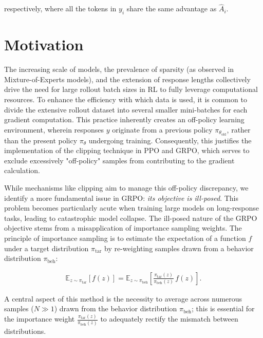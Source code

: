 respectively, where all the tokens in $y_i$ share the same advantage as $\widehat{A}_{i}$.

\section{Motivation}
\label{sec:motivation}

The increasing scale of models, the prevalence of sparsity (as observed in Mixture-of-Experts models), and the extension of response lengths collectively drive the need for large rollout batch sizes in RL to fully leverage computational resources. To enhance the efficiency with which data is used, it is common to divide the extensive rollout dataset into several smaller mini-batches for each gradient computation. This practice inherently creates an off-policy learning environment, wherein responses $y$ originate from a previous policy $\pi_{\theta_\text{old}}$, rather than the present policy $\pi_\theta$ undergoing training. Consequently, this justifies the implementation of the clipping technique in PPO and GRPO, which serves to exclude excessively "off-policy" samples from contributing to the gradient calculation.

While mechanisms like clipping aim to manage this off-policy discrepancy, we identify a more fundamental issue in GRPO: \textit{its objective is ill-posed}. This problem becomes particularly acute when training large models on long-response tasks, leading to catastrophic model collapse. The ill-posed nature of the GRPO objective stems from a misapplication of importance sampling weights. The principle of importance sampling is to estimate the expectation of a function $f$ under a target distribution $\pi_\text{tar}$ by re-weighting samples drawn from a behavior distribution $\pi_\text{beh}$:

\begin{align}
\mathbb{E}_{z \sim \pi_\text{tar}} \left[ f(z) \right] = \mathbb{E}_{z \sim \pi_\text{beh}} \left[ \frac{ \pi_\text{tar} (z) }{ \pi_\text{beh} (z)} \, f(z) \right].
\end{align}

A central aspect of this method is the necessity to average across numerous samples ($N \gg 1$) drawn from the behavior distribution $\pi_\text{beh}$; this is essential for the importance weight $\frac{ \pi_\text{tar} (z) }{ \pi_\text{beh} (z)}$ to adequately rectify the mismatch between distributions.

